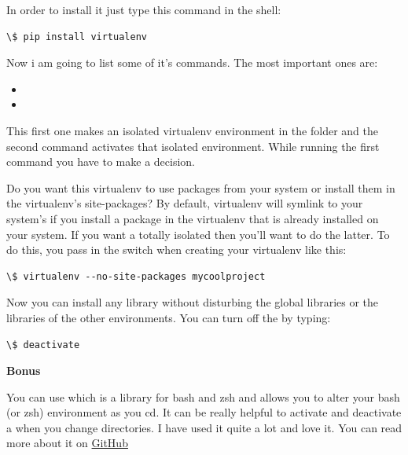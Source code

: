 \documentclass[a4paper,12pt,oneside]{sphinxmanual}
\begin{document}
In order to install it just type this command in the shell:
\begin{Verbatim}[commandchars=\\\{\}]
\$ pip install virtualenv
\end{Verbatim}

Now i am going to list some of it's commands. The most important ones
are:
\begin{itemize}
\item {} 

\item {} 

\end{itemize}

This first one makes an isolated virtualenv environment in the
 folder and the second command activates that isolated
environment. While running the first command you have to make a
decision.

Do you want this virtualenv to use packages from your system
 or install them in the virtualenv’s site-packages? By
default, virtualenv will symlink to your system’s  if
you install a package in the virtualenv that is already installed on
your system. If you want a totally isolated  then you’ll
want to do the latter. To do this, you pass in the
 switch when creating your virtualenv like this:
\begin{Verbatim}[commandchars=\\\{\}]
\$ virtualenv --no-site-packages mycoolproject
\end{Verbatim}

Now you can install any library without disturbing the global libraries
or the libraries of the other environments. You can turn off the 
by typing:
\begin{Verbatim}[commandchars=\\\{\}]
\$ deactivate
\end{Verbatim}

\textbf{Bonus}

You can use  which is a library for bash and zsh and allows
you to alter your bash (or zsh) environment as you cd. It can be really
helpful to activate and deactivate a  when you change
directories. I have used it quite a lot and love it. You can read more
about it on \href{https://github.com/cxreg/smartcd}{GitHub}
\end{document}
